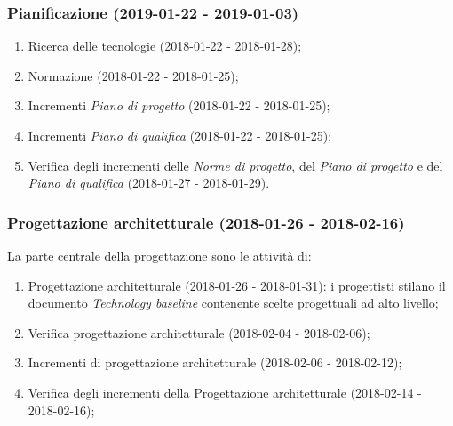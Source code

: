 \subsubsection{Pianificazione (2019-01-22 - 2019-01-03)\\} 
			\begin{enumerate}[label = 3.1.\arabic*)]
				\item Ricerca delle tecnologie (2018-01-22 - 2018-01-28);
				\item Normazione (2018-01-22 - 2018-01-25);
				\item Incrementi \textit{Piano di progetto} (2018-01-22 - 2018-01-25);
				\item Incrementi \textit{Piano di qualifica} (2018-01-22 - 2018-01-25);
				\item Verifica degli incrementi delle \textit{Norme di progetto}, del \textit{Piano di progetto} e del \textit{Piano di qualifica} (2018-01-27 - 2018-01-29).
			\end{enumerate}
	
		\subsubsection{Progettazione architetturale (2018-01-26 - 2018-02-16)\\} La parte centrale della progettazione sono le attività di:
			\begin{enumerate}[label = 3.2.\arabic*)]
				\item Progettazione architetturale (2018-01-26 - 2018-01-31): i progettisti stilano il documento \textit{Technology baseline} contenente scelte progettuali ad alto livello;
				\item Verifica progettazione architetturale (2018-02-04 - 2018-02-06);
				\item Incrementi di progettazione architetturale (2018-02-06 - 2018-02-12);
				\item Verifica degli incrementi della Progettazione architetturale (2018-02-14 - 2018-02-16);
			\end{enumerate}

